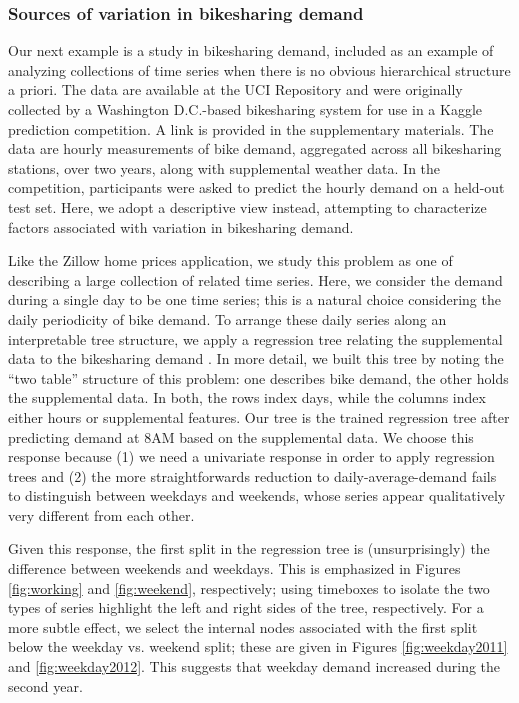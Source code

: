 \subsubsection{Sources of variation in bikesharing
demand}\label{bikesharing-study}

Our next example is a study in bikesharing demand, included as an example of
analyzing collections of time series when there is no obvious hierarchical
structure a priori. The data are available at the UCI Repository and were
originally collected by a Washington D.C.-based bikesharing system for use in a
Kaggle prediction competition. A link is provided in the supplementary
materials. The data are hourly measurements of bike demand, aggregated across
all bikesharing stations, over two years, along with supplemental weather data.
In the competition, participants were asked to predict the hourly demand on a
held-out test set. Here, we adopt a descriptive view instead, attempting to
characterize factors associated with variation in bikesharing demand.

Like the Zillow home prices application, we study this problem as one of
describing a large collection of related time series. Here, we consider
the demand during a single day to be one time series; this is a natural
choice considering the daily periodicity of bike demand. To arrange
these daily series along an interpretable tree structure, we apply a
regression tree relating the supplemental data to the bikesharing demand
\citep{breiman1984classification}. In more
detail, we built this tree by noting the ``two table'' structure of this
problem: one describes bike demand, the other holds the supplemental
data. In both, the rows index days, while the columns index either hours
or supplemental features. Our tree is the trained regression tree after
predicting demand at 8AM based on the supplemental data. We choose this
response because (1) we need a univariate response in order to apply
regression trees and (2) the more straightforwards reduction to
daily-average-demand fails to distinguish between weekdays and weekends,
whose series appear qualitatively very different from each other.

Given this response, the first split in the regression tree is
(unsurprisingly) the difference between weekends and weekdays. This is
emphasized in Figures \ref{fig:working} and \ref{fig:weekend}, respectively;
using timeboxes to isolate the two types of series highlight the left and right
sides of the tree, respectively. For a more subtle effect, we select the
internal nodes associated with the first split below the weekday vs. weekend
split; these are given in Figures \ref{fig:weekday2011} and
\ref{fig:weekday2012}. This suggests that weekday demand increased during the
second year.

